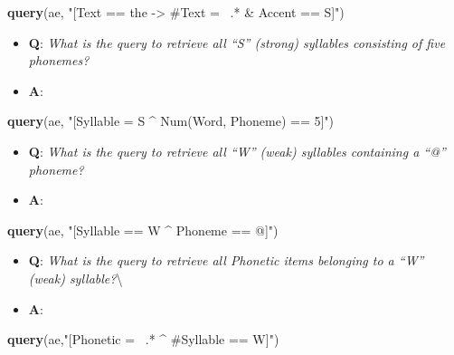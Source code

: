 \documentclass[]{book}
\newenvironment{Shaded}{\begin{snugshade}}{\end{snugshade}}
\newcommand{\KeywordTok}[1]{\textcolor[rgb]{0.13,0.29,0.53}{\textbf{#1}}}
\newcommand{\NormalTok}[1]{#1}
\newcommand{\StringTok}[1]{\textcolor[rgb]{0.31,0.60,0.02}{#1}}
\providecommand{\tightlist}{%
  \setlength{\itemsep}{0pt}\setlength{\parskip}{0pt}}
\theoremstyle{definition}
\theoremstyle{definition}
\theoremstyle{definition}
\theoremstyle{remark}
\begin{document}
\begin{Shaded}
\begin{Highlighting}[]
\KeywordTok{query}\NormalTok{(ae, }\StringTok{"[Text == the -> #Text =~ .* & Accent == S]"}\NormalTok{)}
\end{Highlighting}
\end{Shaded}

\begin{itemize}
\tightlist
\item
  \textbf{Q}: \emph{What is the query to retrieve all ``S'' (strong)
  syllables consisting of five phonemes?}
\item
  \textbf{A}:
\end{itemize}

\begin{Shaded}
\begin{Highlighting}[]
\KeywordTok{query}\NormalTok{(ae, }\StringTok{"[Syllable = S ^ Num(Word, Phoneme) == 5]"}\NormalTok{)}
\end{Highlighting}
\end{Shaded}

\begin{itemize}
\tightlist
\item
  \textbf{Q}: \emph{What is the query to retrieve all ``W'' (weak)
  syllables containing a ``@'' phoneme?}
\item
  \textbf{A}:
\end{itemize}

\begin{Shaded}
\begin{Highlighting}[]
\KeywordTok{query}\NormalTok{(ae, }\StringTok{"[Syllable == W ^ Phoneme == @]"}\NormalTok{)}
\end{Highlighting}
\end{Shaded}

\begin{itemize}
\tightlist
\item
  \textbf{Q}: \emph{What is the query to retrieve all Phonetic items
  belonging to a ``W'' (weak) syllable?}\textbackslash{}
\item
  \textbf{A}:
\end{itemize}

\begin{Shaded}
\begin{Highlighting}[]
\KeywordTok{query}\NormalTok{(ae,}\StringTok{"[Phonetic =~ .* ^ #Syllable == W]"}\NormalTok{)}
\end{Highlighting}
\end{Shaded}
\end{document}
